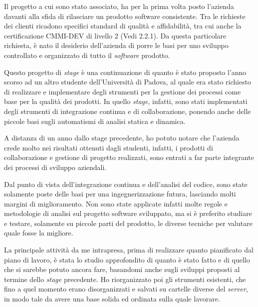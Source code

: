 Il progetto a cui sono stato associato, ha per la prima volta posto l'azienda davanti alla sfida di rilasciare un prodotto software consistente. Tra le richieste dei clienti ricadono specifici standard di qualità e affidabilità, tra cui anche la certificazione CMMI-DEV di livello 2 (Vedi 2.2.1). Da questa particolare richiesta, è nato il desiderio dell'azienda di porre le basi per uno sviluppo controllato e organizzato di tutto il \textit{software} prodotto.



Questo progetto di \textit{stage} è una continuazione di quanto è stato proposto l'anno scorso ad un altro studente dell'Università di Padova, al quale era stato richiesto di realizzare e implementare degli strumenti per la gestione dei processi come base per la qualità dei prodotti. In quello \textit{stage}, infatti, sono stati implementati degli strumenti di integrazione continua e di collaborazione, ponendo anche delle piccole basi sugli automatismi di analisi statica e dinamica.

A distanza di un anno dallo stage precedente, ho potuto notare che l'azienda crede molto nei risultati ottenuti dagli studenti, infatti, i prodotti di collaborazione e gestione di progetto realizzati, sono entrati a far parte integrante dei processi di sviluppo aziendali.

Dal punto di vista dell'integrazione continua e dell'analisi del codice, sono state solamente poste delle basi per una ingegnerizzazione futura, lasciando molti margini di miglioramento. Non sono state applicate infatti molte regole e metodologie di analisi sul progetto software sviluppato, ma si è preferito studiare e testare, solamente su piccole parti del prodotto, le diverse tecniche per valutare quale fosse la migliore.

La principale attività da me intrapresa, prima di realizzare quanto pianificato dal piano di lavoro, è stata lo studio approfondito di quanto è stato fatto e di quello che si sarebbe potuto ancora fare, basandomi anche sugli sviluppi proposti al termine dello \textit{stage} precedente. Ho riorganizzato poi gli strumenti esistenti, che fino a quel momento erano disorganizzati e salvati su cartelle diverse del \textit{server}, in modo tale da avere una base solida ed ordinata sulla quale lavorare.



